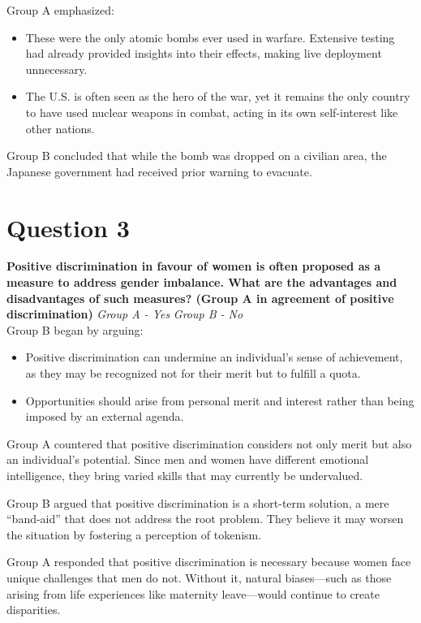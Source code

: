 \documentclass[12pt]{article}
\begin{document}
\noindent Group A emphasized:  
{\fontsize{11pt}{13pt}\selectfont  
\begin{itemize}  
\setlength{\itemsep}{4pt}   
    \item These were the only atomic bombs ever used in warfare. Extensive testing had already provided insights into their effects, making live deployment unnecessary.  
    \item The U.S. is often seen as the hero of the war, yet it remains the only country to have used nuclear weapons in combat, acting in its own self-interest like other nations.  
\end{itemize}  
}  

\noindent Group B concluded that while the bomb was dropped on a civilian area, the Japanese government had received prior warning to evacuate. 

\section{Question 3}
\textbf{Positive discrimination in favour of women is often proposed as a measure to address gender imbalance. What are the advantages and disadvantages of such measures? (Group A in agreement of positive discrimination)}
\textit {Group A - Yes}
\textit {Group B - No}\\
\noindent Group B began by arguing:  
{\fontsize{11pt}{13pt}\selectfont
\begin{itemize}
\setlength{\itemsep}{4pt}
    \item Positive discrimination can undermine an individual’s sense of achievement, as they may be recognized not for their merit but to fulfill a quota.  
    \item Opportunities should arise from personal merit and interest rather than being imposed by an external agenda.  
\end{itemize}
}

\noindent Group A countered that positive discrimination considers not only merit but also an individual’s potential. Since men and women have different emotional intelligence, they bring varied skills that may currently be undervalued.  

\noindent Group B argued that positive discrimination is a short-term solution, a mere “band-aid” that does not address the root problem. They believe it may worsen the situation by fostering a perception of tokenism.  

\noindent Group A responded that positive discrimination is necessary because women face unique challenges that men do not. Without it, natural biases—such as those arising from life experiences like maternity leave—would continue to create disparities.  
\end{document}
